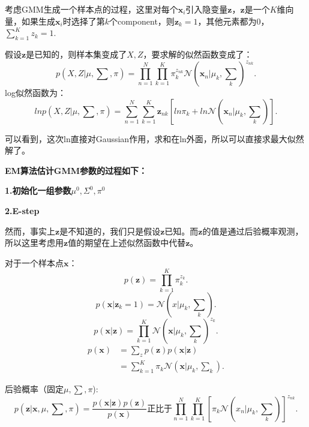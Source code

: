 \documentclass[UTF8]{ctexart}
\begin{document}
考虑GMM生成一个样本点的过程，这里对每个$\mathbf x_i$引入隐变量$\mathbf z$，$\mathbf z$是一个$K$维向量，如果生成$\mathbf x_i$时选择了第$k$个component，则$\mathbf z_k=1$，其他元素都为0，$\sum_{k=1}^{K}z_k=1$.

假设$\mathbf z$是已知的，则样本集变成了${X,Z}$，要求解的似然函数变成了：
\begin{equation}
  p(X,Z|\mu,\sum,\pi) = \prod_{n=1}^N\prod_{k=1}^K\pi_k^{z_{nk}}\mathcal N(\mathbf x_n|\mu_k,\sum_k)^{z_{nk}}.
\end{equation}
log似然函数为：
\begin{equation}\label{loglikelihood}
  lnp(X,Z|\mu,\sum,\pi) = \sum_{n=1}^N\sum_{k=1}^K\mathbf z_{nk}[ln\pi_k + ln\mathcal N(\mathbf x_n|\mu_k,\sum_k)].
\end{equation}

可以看到，这次ln直接对Gaussian作用，求和在ln外面，所以可以直接求最大似然解了。

\textbf{EM算法估计GMM参数的过程如下：}

\textbf{1.初始化一组参数$\mu ^0,\Sigma ^0,\pi ^0$}

\textbf{2.E-step}

然而，事实上$\mathbf z$是不知道的，我们只是假设$\mathbf z$已知。而$\mathbf z$的值是通过后验概率观测，所以这里考虑用$\mathbf z$值的期望在上述似然函数中代替$\mathbf z$。

对于一个样本点$\mathbf x$：
\begin{equation}
  p(\mathbf z) = \prod_{k=1}^K\pi_k^{z_k}.
\end{equation}
\begin{equation}
  p(\mathbf x|\mathbf z_k=1) = \mathcal N(x|\mu_k,\sum_k).
\end{equation}
\begin{equation}
  p(\mathbf x|\mathbf z) = \prod_{k=1}^K\mathcal N(\mathbf x|\mu_k,\sum_k)^{z_k}.
\end{equation}
\begin{equation}
  \begin{split}
    p(\mathbf x) &= \sum_zp(\mathbf z)p(\mathbf x|\mathbf z)\\
    &= \sum_{k=1}^K\pi_k\mathcal N(\mathbf x|\mu_k,\sum_k).
  \end{split}
\end{equation}

后验概率（固定$\mu,\sum,\pi$):
\begin{equation}
  p(\mathbf z|\mathbf x,\mu,\sum,\pi) = \frac{p(\mathbf x|\mathbf z)p(\mathbf z)}{p(\mathbf x)}\text{正比于}\prod_{n=1}^N\prod_{k=1}^K[{\pi_k\mathcal N(x_n|\mu_k,\sum_k)}]^{z_{nk}}.
\end{equation}
\end{document}

